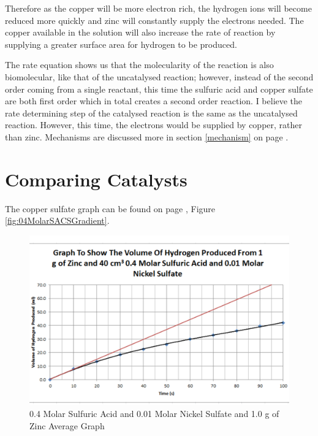 Therefore as the copper will be more electron rich, the hydrogen ions will become reduced more quickly and zinc will constantly supply the electrons needed. The copper available in the solution will also increase the rate of reaction by supplying a greater surface area for hydrogen to be produced.

The rate equation shows us that the molecularity of the reaction is also biomolecular, like that of the uncatalysed reaction; however, instead of the second order coming from a single reactant, this time the sulfuric acid and copper sulfate are both first order which in total creates a second order reaction. I believe the rate determining step of the catalysed reaction is the same as the uncatalysed reaction. However, this time, the electrons would be supplied by copper, rather than zinc. Mechanisms are discussed more in section \ref{mechanism} on page \pageref{mechanism}.







\section{Comparing Catalysts}

The copper sulfate graph can be found on page \pageref{fig:04MolarSACSGradient}, Figure \ref{fig:04MolarSACSGradient}.

\begin{figure}[H]
    \includegraphics[width=\textwidth]{./Analysis/Images/4DifferentCatalysts/Nickel.pdf}
    \caption{0.4 Molar Sulfuric Acid and 0.01 Molar Nickel Sulfate and 1.0 g of Zinc Average Graph} \label{fig:NickelGradient}
\end{figure}

